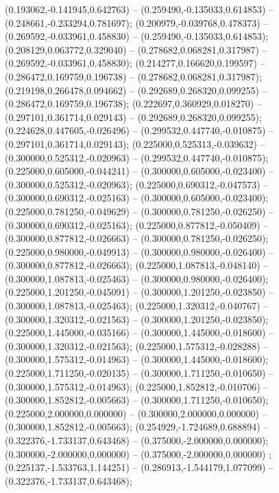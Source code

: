  (0.193062,-0.141945,0.642763) -- (0.259490,-0.135033,0.614853) -- (0.248661,-0.233294,0.781697);
 (0.200979,-0.039768,0.478373) -- (0.269592,-0.033961,0.458830) -- (0.259490,-0.135033,0.614853);
 (0.208129,0.063772,0.329040) -- (0.278682,0.068281,0.317987) -- (0.269592,-0.033961,0.458830);
 (0.214277,0.166620,0.199597) -- (0.286472,0.169759,0.196738) -- (0.278682,0.068281,0.317987);
 (0.219198,0.266478,0.094662) -- (0.292689,0.268320,0.099255) -- (0.286472,0.169759,0.196738);
 (0.222697,0.360929,0.018270) -- (0.297101,0.361714,0.029143) -- (0.292689,0.268320,0.099255);
 (0.224628,0.447605,-0.026496) -- (0.299532,0.447740,-0.010875) -- (0.297101,0.361714,0.029143);
 (0.225000,0.525313,-0.039632) -- (0.300000,0.525312,-0.020963) -- (0.299532,0.447740,-0.010875);
 (0.225000,0.605000,-0.044241) -- (0.300000,0.605000,-0.023400) -- (0.300000,0.525312,-0.020963);
 (0.225000,0.690312,-0.047573) -- (0.300000,0.690312,-0.025163) -- (0.300000,0.605000,-0.023400);
 (0.225000,0.781250,-0.049629) -- (0.300000,0.781250,-0.026250) -- (0.300000,0.690312,-0.025163);
 (0.225000,0.877812,-0.050409) -- (0.300000,0.877812,-0.026663) -- (0.300000,0.781250,-0.026250);
 (0.225000,0.980000,-0.049913) -- (0.300000,0.980000,-0.026400) -- (0.300000,0.877812,-0.026663);
 (0.225000,1.087813,-0.048140) -- (0.300000,1.087813,-0.025463) -- (0.300000,0.980000,-0.026400);
 (0.225000,1.201250,-0.045091) -- (0.300000,1.201250,-0.023850) -- (0.300000,1.087813,-0.025463);
 (0.225000,1.320312,-0.040767) -- (0.300000,1.320312,-0.021563) -- (0.300000,1.201250,-0.023850);
 (0.225000,1.445000,-0.035166) -- (0.300000,1.445000,-0.018600) -- (0.300000,1.320312,-0.021563);
 (0.225000,1.575312,-0.028288) -- (0.300000,1.575312,-0.014963) -- (0.300000,1.445000,-0.018600);
 (0.225000,1.711250,-0.020135) -- (0.300000,1.711250,-0.010650) -- (0.300000,1.575312,-0.014963);
 (0.225000,1.852812,-0.010706) -- (0.300000,1.852812,-0.005663) -- (0.300000,1.711250,-0.010650);
 (0.225000,2.000000,0.000000) -- (0.300000,2.000000,0.000000) -- (0.300000,1.852812,-0.005663);
 (0.254929,-1.724689,0.688894) -- (0.322376,-1.733137,0.643468) -- (0.375000,-2.000000,0.000000);
 (0.300000,-2.000000,0.000000) -- (0.375000,-2.000000,0.000000) ;
 (0.225137,-1.533763,1.144251) -- (0.286913,-1.544179,1.077099) -- (0.322376,-1.733137,0.643468);

